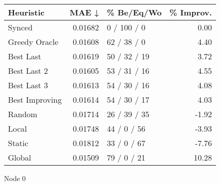 \begin{tabular}{lrlr}
\toprule
\textbf{Heuristic} & \textbf{MAE ↓} & \textbf{\% Be/Eq/Wo} & \textbf{\% Improv.} \\
\midrule
            Synced &        0.01682 &          0 / 100 / 0 &                0.00 \\
     Greedy Oracle &        0.01608 &          62 / 38 / 0 &                4.40 \\
         Best Last &        0.01619 &         50 / 32 / 19 &                3.72 \\
       Best Last 2 &        0.01605 &         53 / 31 / 16 &                4.55 \\
       Best Last 3 &        0.01613 &         54 / 30 / 16 &                4.08 \\
    Best Improving &        0.01614 &         54 / 30 / 17 &                4.03 \\
            Random &        0.01714 &         26 / 39 / 35 &               -1.92 \\
             Local &        0.01748 &          44 / 0 / 56 &               -3.93 \\
            Static &        0.01812 &          33 / 0 / 67 &               -7.76 \\
            Global &        0.01509 &          79 / 0 / 21 &               10.28 \\
\bottomrule
\end{tabular}
\caption{Node 0}
\label{tab:non_lr05_le2_bs4_0}
